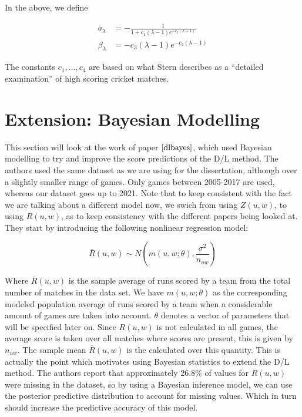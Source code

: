 In the above, we define 

\begin{align*}
    a_\lambda &= -\frac{1}{1+c_1(\lambda-1)e^{-c_2(\lambda-1)}}\\
    \beta_\lambda &= -c_3(\lambda-1)e^{-c_4(\lambda-1)}
\end{align*}

The constants $c_1,\ldots,c_4$ are based on
what Stern describes as a ``detailed examination'' of high scoring cricket matches.

\section{Extension: Bayesian Modelling}
This section will look at the work of paper $\cite{dlbayes}$, which used Bayesian modelling to try and improve the score predictions
of the D/L method. The authors used the same dataset as we are using for the dissertation, although over a slightly smaller range of games.
Only games between 2005-2017 are used, whereas our dataset goes up to 2021. Note that to keep consistent with the fact we are talking about a different
model now, we swich from using $Z(u,w)$, to using $R(u,w)$, as to keep consistency with the different papers being looked at.
They start by introducing the following nonlinear regression model:

\begin{equation}
    \label{dlRegress}
    \bar{R}(u,w) \sim N(m(u,w;\theta),\frac{\sigma^2}{n_{uw}})
\end{equation}

Where $\bar{R}(u,w)$ is the sample average of runs scored by a team from the total number of matches in the data set. We have $m(u,w;\theta)$
as the corresponding modeled population average of runs scored by a team when a considerable amount of games are taken into account. $\theta$ denotes 
a vector of parameters that will be specified later on. Since $R(u,w)$ is not calculated in all games, the average score is taken over all matches where
scores are present, this is given by $n_{uw}$. The sample mean $\bar{R}(u,w)$ is the calculated over this quantity. This is actually the point which motivates
using Bayesian statistics to extend the D/L method. The authors report that approximately $26.8\%$ of values for $R(u,w)$ were missing in the dataset, so by 
using a Bayesian inference model, we can use the posterior predictive distribution to account for missing values. Which in turn should increase the 
predictive accuracy of this model. \\

